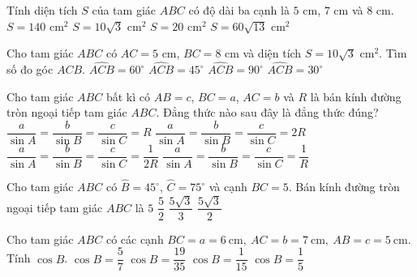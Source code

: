 \begin{ex}
	Tính diện tích $S$ của tam giác $ABC$ có độ dài ba cạnh là $5$ cm, $7$ cm và $8$ cm.
	\choice
	{$S=140$ cm$^2$}
	{\True $S=10\sqrt{3}$ cm$^2$}
	{$S=20$ cm$^2$}
	{$S=60\sqrt{13}$ cm$^2$}
\end{ex}
\begin{ex}
	Cho tam giác $ABC$ có $AC=5$ cm, $BC=8$ cm và diện tích $S=10\sqrt{3}$ cm$^2$. Tìm số đo góc $ACB$.
	\choice
	{\True $\widehat{ACB}=60^{\circ}$}
	{$\widehat{ACB}=45^{\circ}$}
	{$\widehat{ACB}=90^{\circ}$}
	{$\widehat{ACB}=30^{\circ}$}
\end{ex}
\begin{ex}
	Cho tam giác $ABC$ bất kì có $AB=c$, $BC=a$, $AC=b$ và $R$ là bán kính đường tròn ngoại tiếp tam giác $ABC$. Đẳng thức nào sau đây là đẳng thức đúng?
	\choice
	{$\dfrac{a}{\sin A}=\dfrac{b}{\sin B}=\dfrac{c}{\sin C}=R$}
	{\True $\dfrac{a}{\sin A}=\dfrac{b}{\sin B}=\dfrac{c}{\sin C}=2R$}
	{$\dfrac{a}{\sin A}=\dfrac{b}{\sin B}=\dfrac{c}{\sin C}=\dfrac{1}{2R}$}
	{$\dfrac{a}{\sin A}=\dfrac{b}{\sin B}=\dfrac{c}{\sin C}=\dfrac{1}{R}$}
\end{ex}
\begin{ex}
	Cho tam giác $ABC$ có $\widehat{B}=45^\circ$, $\widehat{C}=75^\circ$ và cạnh $BC=5$. Bán kính đường tròn ngoại tiếp tam giác $ABC$ là
	\choice
	{$5$}
	{$\dfrac{5}{2}$}
	{\True $\dfrac{5 \sqrt{3}}{3}$}
	{$\dfrac{5 \sqrt{3}}{2}$}
\end{ex}
\begin{ex}
	Cho tam giác $ABC$ có các cạnh $BC=a=6\ \mathrm{cm},\ AC=b=7\ \mathrm{cm},\ AB=c=5\ \mathrm{cm}$. Tính $\cos B$.
	\choice
	{$\cos B=\dfrac{5}{7}$}
	{$\cos B=\dfrac{19}{35}$}
	{$\cos B=\dfrac{1}{15}$}
	{\True $\cos B=\dfrac{1}{5}$}
\end{ex}
